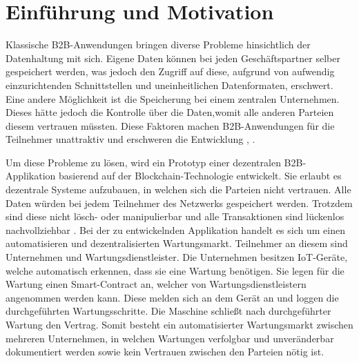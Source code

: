 \chapter{Einführung und Motivation}
\label{cha:einfuehrung}


Klassische B2B-Anwendungen bringen diverse Probleme hinsichtlich der Datenhaltung mit sich. Eigene Daten können bei jeden Geschäftspartner selber gespeichert werden, was jedoch den Zugriff auf diese, aufgrund von aufwendig einzurichtenden Schnittstellen und uneinheitlichen Datenformaten, erschwert. Eine andere Möglichkeit ist die Speicherung bei einem zentralen Unternehmen. Dieses hätte jedoch die Kontrolle über die Daten,womit alle anderen Parteien diesem vertrauen müssten. Diese Faktoren machen B2B-Anwendungen für die Teilnehmer unattraktiv und erschweren die Entwicklung \cite{KorpelaDigitalSupplyChain2017}, \cite{AbeyratneBlockchainreadymanufacturing2016}.

Um diese Probleme zu lösen, wird ein Prototyp einer dezentralen B2B-Applikation basierend auf der Blockchain-Technologie entwickelt. Sie erlaubt es dezentrale Systeme aufzubauen, in welchen sich die Parteien nicht vertrauen. Alle Daten würden bei jedem Teilnehmer des Netzwerks gespeichert werden. Trotzdem sind diese nicht lösch- oder manipulierbar und alle Transaktionen sind lückenlos nachvollziehbar \cite{AntonopoulosMasteringBitcoinUnlocking2017}. Bei der zu entwickelnden Applikation handelt es sich um einen automatisieren und dezentralisierten Wartungsmarkt. Teilnehmer an diesem sind Unternehmen und Wartungsdienstleister. Die Unternehmen besitzen IoT-Geräte, welche automatisch erkennen, dass sie eine Wartung benötigen. Sie legen für die Wartung einen Smart-Contract an, welcher von Wartungsdienstleistern angenommen werden kann. Diese melden sich an dem Gerät an und loggen die durchgeführten Wartungsschritte. Die Maschine schließt nach durchgeführter Wartung den Vertrag. Somit besteht ein automatisierter Wartungsmarkt zwischen mehreren Unternehmen, in welchen Wartungen verfolgbar und unveränderbar dokumentiert werden sowie kein Vertrauen zwischen den Parteien nötig ist.

